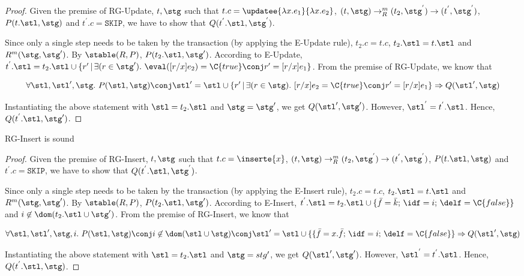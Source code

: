 \begin{proof}
Given the premise of RG-Update, $t, \stg$ such that $t.c = \updatee{\lambda x.e_1}{\lambda x.e_2}$, $(t, \stg) \rightarrow_{R}^{m} (t_2, \stg^{'}) \rightarrow (t^{'}, \stg^{'})$, $P(t.\stl, \stg)$ and $t^{'}.c = \texttt{SKIP}$, we have to show that $Q(t^{'}.\stl, \stg^{'})$. 

Since only a single step needs to be taken by the transaction (by applying the E-Update rule), $t_2.c = t.c$, $t_2.\stl = t.\stl$ and $R^m(\stg, \stg')$. By $\stable(R, P)$, $P(t_2.\stl, \stg')$. According to E-Update,  $t^{'}.\stl = t_2.\stl \cup \{r' \,|\, \exists(r\in \stg').~ \eval([r/x]e_2)=\C{true} \conj r'=[r/x]e_1\}$. From the premise of RG-Update, we know that 

$$
\forall\stl,\stl',\stg.~P(\stl,\stg) \conj 
  \stl' = \stl \cup \{r' \,|\, \exists(r \in \stg).~ [r/x]e_2 =\C{true} \conj r'=[r/x]e_1\} \Rightarrow 
  Q(\stl',\stg)
$$

Instantiating the above statement with $\stl = t_2.\stl$ and $\stg = \stg'$, we get $Q(\stl',\stg')$. However, $\stl^{'} = t^{'}.\stl$. Hence, $Q(t^{'}.\stl,\stg')$.
\end{proof}

\begin{theorem}
RG-Insert is sound
\end{theorem}

\begin{proof}
Given the premise of RG-Insert, $t, \stg$ such that $t.c = \inserte{x}$, $(t, \stg) \rightarrow_{R}^{m} (t_2, \stg^{'}) \rightarrow (t^{'}, \stg^{'})$, $P(t.\stl, \stg)$ and $t^{'}.c = \texttt{SKIP}$, we have to show that $Q(t^{'}.\stl, \stg^{'})$. 

Since only a single step needs to be taken by the transaction (by applying the E-Insert rule), $t_2.c = t.c$, $t_2.\stl = t.\stl$ and $R^m(\stg, \stg')$. By $\stable(R, P)$, $P(t_2.\stl, \stg')$. According to E-Insert, $t^{'}.\stl = t_2.\stl \cup \{\bar{f}=\bar{k};\,\idf=i;\,\delf=\C{false}\}$ and $i \not\in \dom(t_2.\stl \cup \stg')$. From the premise of RG-Insert, we know that 

$$
\forall\stl,\stl',\stg,i.~P(\stl,\stg) \conj i \not\in
  \dom(\stl\cup\stg) \\
  \conj \stl'=\stl \cup 
  \{\{\bar{f}=x.\bar{f};\,\idf=i;\,\delf=\C{false}\} \Rightarrow 
  Q(\stl',\stg)
$$

Instantiating the above statement with $\stl = t_2.\stl$ and $\stg = stg'$, we get $Q(\stl',\stg')$. However, $\stl^{'} = t^{'}.\stl$. Hence, $Q(t^{'}.\stl,\stg)$.
\end{proof}

